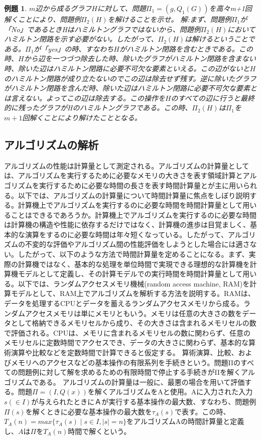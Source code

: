 \documentclass[twocolumn]{jarticle}
\newtheorem{reidai}{例題}
\begin{document}
\begin{reidai}
$m$辺から成るグラフ$H$に対して、問題$\Pi_1=(g,Q_1(G))$を高々m+1回解くことにより、問題例$\Pi_2(H)$を解けることを示せ。
解:まず、問題例$\Pi_1$が「No」であるときHはハミルトングラフではないから、問題例$\Pi_2(H)$においてハミルトン閉路を示す必要がない。したがって、$\Pi_2(H)$は解けるということである。$\Pi_1$が「yes」の時、すなわち$H$がハミルトン閉路を含むときである。この時、$H$から辺を一つづつ除去した時、除いたグラフがハミルトン閉路を含まない時、除いた辺はハミルトン閉路に必要不可欠な要素といえる。この辺がないと$H$のハミルトン閉路が成り立たないのでこの辺は除去せず残す。逆に除いたグラフがハミルトン閉路を含んだ時、除いた辺はハミルトン閉路に必要不可欠な要素とは言えない。よってこの辺は除去する。この操作を$H$のすべての辺に行うと最終的に残ったグラフがHのハミルトングラフである。この時、$\Pi_2(H)$は$\Pi_1$を$m+1$回解くことにより解けたこととなる。
\end{reidai}

\subsection{アルゴリズムの解析}
アルゴリズムの性能は計算量として測定される。アルゴリズムの計算量としては、アルゴリズムを実行するために必要なメモリの大きさを表す領域計算とアルゴリズムを実行するために必要な時間の長さを表す時間計算量とが主に用いられる。以下では、アルゴリズムの計算量について時間計算量に焦点をしぼり説明する。計算機上でアルゴリズムを実行するのに必要な時間を時間計算量として用いることはできるであろうか。計算機上でアルゴリズムを実行するのに必要な時間は計算機の構造や性能に依存するだけではなく、計算機の進歩は目覚ましく、基本的な演算をするのに必要な時間は年々短くなっている。したがって、アルゴリズムの不変的な評価やアルゴリズム間の性能評価をしようとした場合には適さない。したがって、以下のような方法で時間計算量を定めることになる。まず、実際の計算機ではなく、基本的な処理を単位時間で実現できる理想的な計算機を計算機モデルとして定義し、その計算モデルでの実行時間を時間計算量として用いる。以下では、ランダムアクセスメモリ機械(random access machine, RAM)を計算モデルとして、RAM上でアルゴリズムを解析する方法を説明する。RAMは、データを処理するCPUとデータを蓄えるランダムアクセスメモリから成る。ランダムアクセスメモリは単にメモリともいう。メモリは任意の大きさの数をデータとして格納できるメモリセルから成り、その大きさは含まれるメモリセルの数で評価される。CPUは、メモリに含まれるメモリセルの数に関わらず、任意のメモリセルに定数時間でアクセスでき、データの大きさに関わらず、基本的な算術演算や比較などを定数時間で計算できると仮定する。
算術演算、比較、およびメモリへのアクセスなどの基本操作の有限系列を手続きという。問題Πのすべての問題例に対して解を求めるための有限時間で停止する手続きがΠを解くアルゴリズムである。
アルゴリズムの計算量は一般に、最悪の場合を用いて評価する。問題$\Pi=(I,Q(x))$を解くアルゴリズムをAと使用。Aに入力された入力$s(\in I)$が与えられたときにＡが実行する基本操作の最大数、すなわち、問題例$\Pi(s)$を解くときに必要な基本操作の最大数を$\tau_A(s)$で表す。この時、$T_A(n)=max\{\tau_A(s) \mid s \in I,|s|=n\}$をアルゴリズムAの時間計算量と定義し、$A$は$\Pi$を$T_A(n)$時間で解くという。
\end{document}
